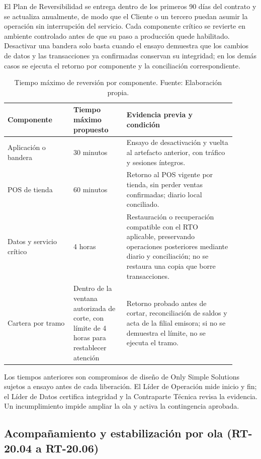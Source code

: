 \documentclass[11pt]{article}
\begin{document}
El Plan de Reversibilidad se entrega dentro de los primeros 90 días del contrato y se actualiza anualmente, de modo que el Cliente o un tercero puedan asumir la operación sin interrupción del servicio. Cada componente crítico se revierte en ambiente controlado antes de que su paso a producción quede habilitado. Desactivar una bandera solo basta cuando el ensayo demuestra que los cambios de datos y las transacciones ya confirmadas conservan su integridad; en los demás casos se ejecuta el retorno por componente y la conciliación correspondiente.


\begin{longtable}{@{}p{0.26\linewidth}p{0.21\linewidth}p{0.43\linewidth}@{}}
\caption[Tiempo máximo de reversión por componente]{Tiempo máximo de reversión por componente. Fuente: Elaboración propia.}\label{tab:t18-5}\\
\toprule
\textbf{Componente} & \textbf{Tiempo máximo propuesto} & \textbf{Evidencia previa y condición} \\
\midrule
\endhead
\bottomrule
\endlastfoot
Aplicación o bandera & 30 minutos & Ensayo de desactivación y vuelta al artefacto anterior, con tráfico y sesiones íntegros. \\
POS de tienda & 60 minutos & Retorno al POS vigente por tienda, sin perder ventas confirmadas; diario local conciliado. \\
Datos y servicio crítico & 4 horas & Restauración o recuperación compatible con el RTO aplicable, preservando operaciones posteriores mediante diario y conciliación; no se restaura una copia que borre transacciones. \\
Cartera por tramo & Dentro de la ventana autorizada de corte, con límite de 4 horas para restablecer atención & Retorno probado antes de cortar, reconciliación de saldos y acta de la filial emisora; si no se demuestra el límite, no se ejecuta el tramo. \\
\end{longtable}

Los tiempos anteriores son compromisos de diseño de Only Simple Solutions sujetos a ensayo antes de cada liberación. El Líder de Operación mide inicio y fin; el Líder de Datos certifica integridad y la Contraparte Técnica revisa la evidencia. Un incumplimiento impide ampliar la ola y activa la contingencia aprobada.

\subsection*{Acompañamiento y estabilización por ola (RT-20.04 a RT-20.06)}
\end{document}
